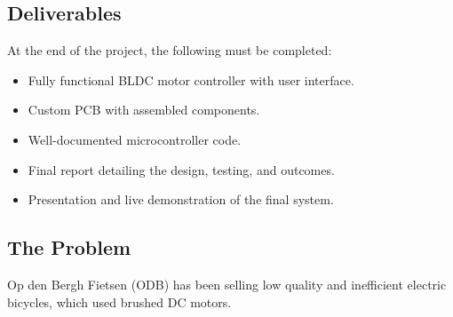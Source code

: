 \subsection{Deliverables}
At the end of the project, the following must be completed:
\begin{itemize}
    \item Fully functional BLDC motor controller with user interface.
    \item Custom PCB with assembled components.
    \item Well-documented microcontroller code.
    \item Final report detailing the design, testing, and outcomes.
    \item Presentation and live demonstration of the final system.
\end{itemize}


\subsection{The Problem}
Op den Bergh Fietsen (ODB) has been selling low quality and inefficient electric bicycles, which used brushed DC motors. 



